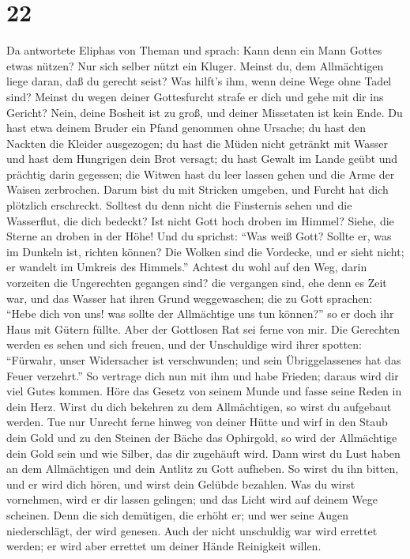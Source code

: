 \hypertarget{section-21}{%
\section{22}\label{section-21}}

 Da antwortete Eliphas von Theman und sprach: 
Kann denn ein Mann Gottes etwas nützen? Nur sich selber nützt ein
Kluger.  Meinst du, dem Allmächtigen liege daran, daß du
gerecht seist? Was hilft's ihm, wenn deine Wege ohne Tadel sind?
 Meinst du wegen deiner Gottesfurcht strafe er dich und gehe
mit dir ins Gericht?  Nein, deine Bosheit ist zu groß, und
deiner Missetaten ist kein Ende.  Du hast etwa deinem Bruder
ein Pfand genommen ohne Ursache; du hast den Nackten die Kleider
ausgezogen;  du hast die Müden nicht getränkt mit Wasser und
hast dem Hungrigen dein Brot versagt;  du hast Gewalt im
Lande geübt und prächtig darin gegessen;  die Witwen hast du
leer lassen gehen und die Arme der Waisen zerbrochen. 
Darum bist du mit Stricken umgeben, und Furcht hat dich plötzlich
erschreckt.  Solltest du denn nicht die Finsternis sehen
und die Wasserflut, die dich bedeckt?  Ist nicht Gott hoch
droben im Himmel? Siehe, die Sterne an droben in der Höhe! 
Und du sprichst: ``Was weiß Gott? Sollte er, was im Dunkeln ist, richten
können?  Die Wolken sind die Vordecke, und er sieht nicht;
er wandelt im Umkreis des Himmels.''  Achtest du wohl auf
den Weg, darin vorzeiten die Ungerechten gegangen sind? 
die vergangen sind, ehe denn es Zeit war, und das Wasser hat ihren Grund
weggewaschen;  die zu Gott sprachen: ``Hebe dich von uns!
was sollte der Allmächtige uns tun können?''  so er doch
ihr Haus mit Gütern füllte. Aber der Gottlosen Rat sei ferne von mir.
 Die Gerechten werden es sehen und sich freuen, und der
Unschuldige wird ihrer spotten:  ``Fürwahr, unser
Widersacher ist verschwunden; und sein Übriggelassenes hat das Feuer
verzehrt.''  So vertrage dich nun mit ihm und habe Frieden;
daraus wird dir viel Gutes kommen.  Höre das Gesetz von
seinem Munde und fasse seine Reden in dein Herz.  Wirst du
dich bekehren zu dem Allmächtigen, so wirst du aufgebaut werden. Tue nur
Unrecht ferne hinweg von deiner Hütte  und wirf in den
Staub dein Gold und zu den Steinen der Bäche das Ophirgold,
 so wird der Allmächtige dein Gold sein und wie Silber, das
dir zugehäuft wird.  Dann wirst du Lust haben an dem
Allmächtigen und dein Antlitz zu Gott aufheben.  So wirst
du ihn bitten, und er wird dich hören, und wirst dein Gelübde bezahlen.
 Was du wirst vornehmen, wird er dir lassen gelingen; und
das Licht wird auf deinem Wege scheinen.  Denn die sich
demütigen, die erhöht er; und wer seine Augen niederschlägt, der wird
genesen.  Auch der nicht unschuldig war wird errettet
werden; er wird aber errettet um deiner Hände Reinigkeit willen.

